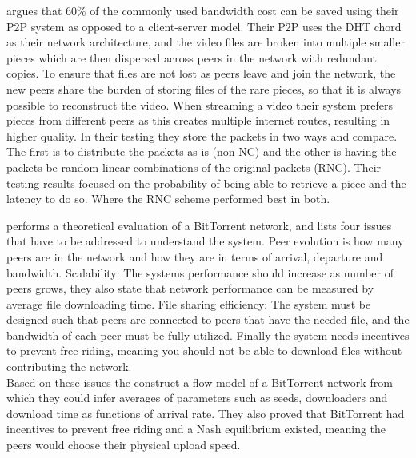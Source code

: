 \citeauthor{nguyen2009p2p} \cite{nguyen2009p2p} argues that 60\% of the commonly used bandwidth cost can be saved using their \ac{P2P} system as opposed to a client-server model. Their \acs{P2P} uses the \ac{DHT} chord as their network architecture, and the video files are broken into multiple smaller pieces which are then dispersed across peers in the network with redundant copies. To ensure that files are not lost as peers leave and join the network, the new peers share the burden of storing files of the rare pieces, so that it is always possible to reconstruct the video. When streaming a video their system prefers pieces from different peers as this creates multiple internet routes, resulting in higher quality. In their testing they store the packets in two ways and compare. The first is to distribute the packets as is (non-NC) and the other is having the packets be random linear combinations of the original packets (RNC). Their testing results focused on the probability of being able to retrieve a piece and the latency to do so. Where the RNC scheme performed best in both.

\citeauthor{qiu2004modeling} \cite{qiu2004modeling} performs a theoretical evaluation of a BitTorrent network, and lists four issues that have to be addressed to understand the system.
Peer evolution is how many peers are in the network and how they are in terms of arrival, departure and bandwidth.
Scalability: The systems performance should increase as number of peers grows, they also state that network performance can be measured by average file downloading time.
File sharing efficiency: The system must be designed such that peers are connected to peers that have the needed file, and the bandwidth of each peer must be fully utilized.
Finally the system needs incentives to prevent free riding, meaning you should not be able to download files without contributing the network.\\
Based on these issues the construct a flow model of a BitTorrent network from which they could infer averages of parameters such as seeds, downloaders and download time as functions of arrival rate. They also proved that BitTorrent had incentives to prevent free riding and a Nash equilibrium existed, meaning the peers would choose their physical upload speed.

